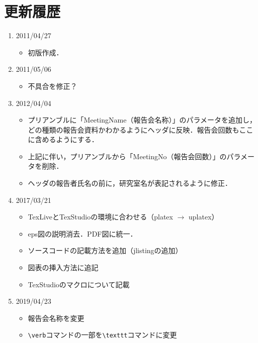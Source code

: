 \documentclass[uplatex]{jsarticle}
\begin{document}


\appendix
\section{更新履歴}
\begin{enumerate}
\item 2011/04/27
\begin{itemize}
\item 初版作成．
\end{itemize}
%
\item 2011/05/06
\begin{itemize}
\item 不具合を修正？
\end{itemize}
%
\item 2012/04/04
\begin{itemize}
\item プリアンブルに「MeetingName（報告会名称）」のパラメータを追加し，どの種類の報告会資料かわかるようにヘッダに反映．報告会回数もここに含めるようにする．
\item 上記に伴い，プリアンブルから「MeetingNo（報告会回数）」のパラメータを削除．
\item ヘッダの報告者氏名の前に，研究室名が表記されるように修正．
\end{itemize}
%
\item 2017/03/21
\begin{itemize}
	\item TexLiveとTexStudioの環境に合わせる（platex $\to$ uplatex）
	\item eps図の説明消去．PDF図に統一．
	\item ソースコードの記載方法を追加（jlistingの追加）
	\item 図表の挿入方法に追記
	\item TexStudioのマクロについて記載
\end{itemize}
%
\item 2019/04/23
\begin{itemize}
	\item 報告会名称を変更
	\item \verb|\verb|コマンドの一部を\verb|\texttt|コマンドに変更
\end{itemize}
%
\end{enumerate}
\end{document}
